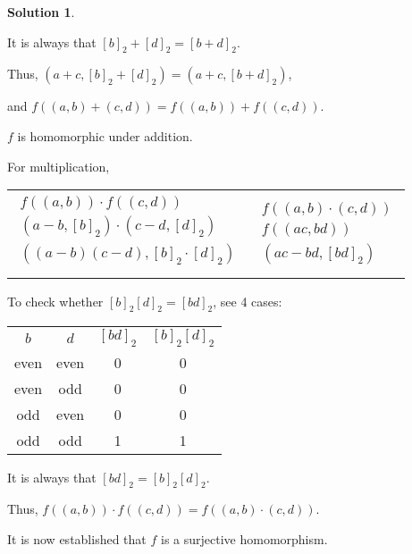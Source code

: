 \documentclass[12pt]{article}
\theoremstyle{definition}
\newtheorem*{soln}{Solution}
\begin{document}
\begin{soln}
\begin{center}
It is always that $[b]_2+[d]_2=[b+d]_2$.

Thus, $(a+c,[b]_2+[d]_2)=(a+c,[b+d]_2)$,

and $f((a,b)+(c,d))=f((a,b))+f((c,d))$.

$f$ is homomorphic under addition.
\end{center}

For multiplication,

\begin{center}
\begin{tabular}{c|c}
$\begin{gathered}
f((a,b))\cdot f((c,d))\\
(a-b,[b]_2)\cdot (c-d,[d]_2)\\
((a-b)(c-d),[b]_2\cdot [d]_2)\\
\end{gathered}$
&
$\begin{gathered}
f((a,b)\cdot (c,d))\\
f((ac,bd))\\
(ac-bd,[bd]_2)
\end{gathered}$
\end{tabular}

To check whether $[b]_2[d]_2=[bd]_2$, see 4 cases:

\begin{tabular}{c c c c}
$b$ & $d$ & $[bd]_2$ & $[b]_2[d]_2$ \\
even & even & 0 & 0\\
even & odd & 0 & 0\\
odd & even & 0 & 0\\
odd & odd & 1 & 1
\end{tabular}

It is always that $[bd]_2=[b]_2[d]_2$.

Thus, $f((a,b))\cdot f((c,d))=f((a,b)\cdot (c,d))$.

\end{center}

It is now established that $f$ is a surjective homomorphism.


\end{soln}
\end{document}
